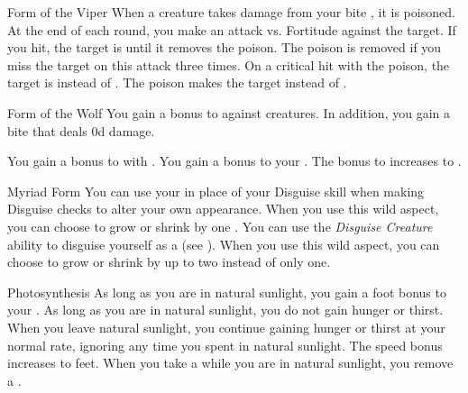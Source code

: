 {\begin{freeability}{Form of the Viper}
                \rankline
                 When a creature takes damage from your bite , it is poisoned.
                At the end of each round, you make an attack vs. Fortitude against the target.
                If you hit, the target is  until it removes the poison.
                The poison is removed if you miss the target on this attack three times.
                 On a critical hit with the poison, the target is  instead of .
                 The poison makes the target  instead of .
            \end{freeability}

            \begin{freeability}{Form of the Wolf}
                You gain a  bonus to  against  creatures.
                In addition, you gain a bite  that deals \plus0d damage.

                \rankline
                 You gain a  bonus to  with .
                 You gain a  bonus to your .
                 The bonus to  increases to .
            \end{freeability}

            \begin{freeability}{Myriad Form}
                You can use your  in place of your Disguise skill when making Disguise checks to alter your own appearance.
                \rankline
                 When you use this wild aspect, you can choose to grow or shrink by one .
                 You can use the \textit{Disguise Creature} ability to disguise yourself as a  (see ).
                 When you use this wild aspect, you can choose to grow or shrink by up to two  instead of only one.
            \end{freeability}

            \begin{freeability}{Photosynthesis}
                As long as you are in natural sunlight, you gain a  foot bonus to your .
                \rankline
                 As long as you are in natural sunlight, you do not gain hunger or thirst.
                When you leave natural sunlight, you continue gaining hunger or thirst at your normal rate, ignoring any time you spent in natural sunlight.
                 The speed bonus increases to  feet.
                 When you take a  while you are in natural sunlight, you remove a .
            \end{freeability}

}
